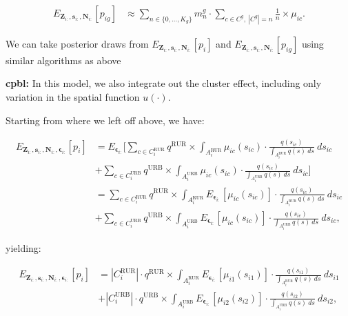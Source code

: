 \documentclass[12pt]{article}
\begin{document}
 \begin{align}
 E_{\boldsymbol{Z}_{i:}, \boldsymbol{s}_{i:}, \boldsymbol{N}_{i:}} \left [p_{ig} \right ] & \approx \sum_{n \in \{0,...,K_g\}} m_n^g  \cdot \sum_{c \in C^g, \ |C^g|=n} \frac{1}{n}  \times  \mu_{ic}. \label{eq:CpblPixel}
 \end{align}
 
 We can take posterior draws from $ E_{\boldsymbol{Z}_{i:}, \boldsymbol{s}_{i:}, \boldsymbol{N}_{i:}} \left [p_{i} \right ]$ and $ E_{\boldsymbol{Z}_{i:}, \boldsymbol{s}_{i:}, \boldsymbol{N}_{i:}} \left [p_{ig} \right ]$ using similar algorithms as above
 
 \medskip
 \noindent
 \textbf{cpbl:} In this model, we also integrate out the cluster effect, including only variation in the spatial function $u(\cdot)$.
 
 Starting from where we left off above, we have: 
 
\begin{align*}
E_{\boldsymbol{Z}_{i:}, \boldsymbol{s}_{i:}, \boldsymbol{N}_{i:}, \boldsymbol{ \epsilon }_{i:}} \left [p_{i} \right ] &= E_{\boldsymbol{ \epsilon }_{i:}} \bigg [ \sum_{c \in C_i^{\mathrm{RUR}}} q^{\mathrm{RUR}} \times \int_{A_i^{\mathrm{RUR}}} \mu_{ic}(s_{ic}) \cdot \frac{q(s_{ic})}{\int_{A_i^{\mathrm{RUR}}} q(s) \ ds} \ ds_{ic} \nonumber \\
&+ \sum_{c \in C_i^{\mathrm{URB}}} q^{\mathrm{URB}} \times \int_{A_i^{\mathrm{URB}}} \mu_{ic}(s_{ic}) \cdot \frac{q(s_{ic})}{\int_{A_i^{\mathrm{URB}}} q(s) \ ds} \ ds_{ic} \bigg ] \\
&= \sum_{c \in C_i^{\mathrm{RUR}}} q^{\mathrm{RUR}} \times \int_{A_i^{\mathrm{RUR}}} E_{\boldsymbol{ \epsilon }_{i:}} [\mu_{ic}(s_{ic})] \cdot \frac{q(s_{ic})}{\int_{A_i^{\mathrm{RUR}}} q(s) \ ds} \ ds_{ic} \nonumber \\
&+ \sum_{c \in C_i^{\mathrm{URB}}} q^{\mathrm{URB}} \times \int_{A_i^{\mathrm{URB}}} E_{\boldsymbol{ \epsilon }_{i:}}  [\mu_{ic}(s_{ic}) ] \cdot \frac{q(s_{ic})}{\int_{A_i^{\mathrm{URB}}} q(s) \ ds} \ ds_{ic},
\end{align*}

yielding: 

\begin{align}
E_{\boldsymbol{Z}_{i:}, \boldsymbol{s}_{i:}, \boldsymbol{N}_{i:}, \boldsymbol{ \epsilon }_{i:}} \left [p_{i} \right ] &= |C_i^{\mathrm{RUR}}|  \cdot q^{\mathrm{RUR}} \times \int_{A_i^{\mathrm{RUR}}} E_{\boldsymbol{ \epsilon }_{i:}} [\mu_{i1}(s_{i1})] \cdot \frac{q(s_{i1})}{\int_{A_i^{\mathrm{RUR}}} q(s) \ ds} \ ds_{i1} \nonumber \\
&+ |C_i^{\mathrm{URB}}|  \cdot q^{\mathrm{URB}} \times \int_{A_i^{\mathrm{URB}}} E_{\boldsymbol{ \epsilon }_{i:}}  [\mu_{i2}(s_{i2}) ] \cdot \frac{q(s_{i2})}{\int_{A_i^{\mathrm{URB}}} q(s) \ ds} \ ds_{i2}, \label{eq:cpblCounty}
\end{align}
\end{document}
